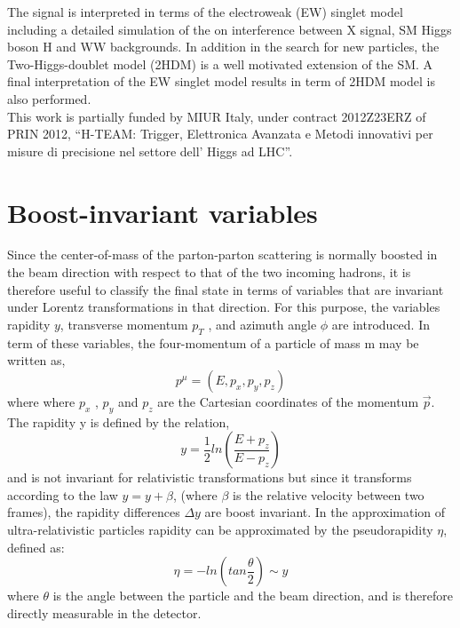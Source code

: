 \documentclass[PhD,binding=0.6cm]{../sapthesis}
\begin{document}
The signal is interpreted in terms of the electroweak (EW) singlet model including a detailed simulation of the on interference between X signal, SM Higgs boson H and WW backgrounds.
In addition in the search for new particles, the  Two-Higgs-doublet model (2HDM)  is a well motivated extension of the SM. A final interpretation of the EW singlet model results in term of 2HDM model is also performed.\\
\newline
This work is partially funded by MIUR Italy, under contract 2012Z23ERZ of PRIN 2012, ``H-TEAM: Trigger, Elettronica Avanzata e Metodi innovativi per misure di precisione nel settore dell’ Higgs ad LHC''.

\mainmatter


{} 
{} 
{} 
{} 
{} 
{}
{}
{}
{}
{} 
{} 

\appendix

\chapter{Boost-invariant variables}
\label{psr}
Since the center-of-mass of the parton-parton scattering is normally boosted in the beam
direction with respect to that of the two incoming hadrons, it is therefore useful to classify
the final state in terms of variables that are invariant under Lorentz transformations in
that direction. For this purpose, the variables rapidity $y$, transverse momentum $p_T$ , and
azimuth angle $\phi$ are introduced. In term of these variables, the four-momentum of a
particle of mass m may be written as,
\begin{equation}
p^{\mu}=(E,p_x,p_y,p_z)
\end{equation}
where where $p_x$ , $p_y$ and $p_z$ are the Cartesian coordinates of the momentum $\vec{p}$. 
The rapidity y is defined by the relation,
\begin{equation}
y=\frac{1}{2} ln (\frac{E+p_z}{E-p_z})
\end{equation}
and is not invariant for relativistic transformations but since it transforms according to
the law $y = y + \beta$, (where $\beta$ is the relative velocity between two frames), the rapidity
differences $\Delta y$ are boost invariant. In the approximation of ultra-relativistic particles rapidity can be approximated by the pseudorapidity $\eta$, defined as:
\begin{equation}
\eta=- ln (tan \frac{\theta}{2}) \sim y
\end{equation}
where $\theta$ is the angle between the particle and the beam direction, and
is therefore directly measurable in the detector.
\end{document}
